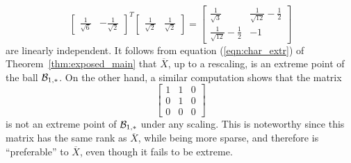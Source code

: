 \documentclass[smallextended,numbook]{svjour3}
\begin{document}
\begin{exa}
{\[\left[ \begin{array}{cc}
\frac{1}{\sqrt{6}} & -\frac{1}{\sqrt{2}}
\end{array} \right]^T
\left[ \begin{array}{cc}
\frac{1}{\sqrt{2}} & \frac{1}{\sqrt{2}}
\end{array} \right]= \left[ \begin{array}{cc}
\frac{1}{\sqrt{3}} & \frac{1}{\sqrt{12}} -\frac{1}{2} \\
\frac{1}{\sqrt{12}}-\frac{1}{2} & -1
\end{array} \right]
\] 
are linearly independent. It follows from equation (\ref{eqn:char_extr}) of Theorem~\ref{thm:exposed_main} that $\overline{X}$, up to a rescaling, is an extreme point of the ball ${{\cal B}}_{1,*}$.
On the other hand, a similar computation shows that the matrix 
\[\left[ \begin{array}{ccc}
1 & 1 &0 \\
0 & 1 & 0 \\
0 & 0 & 0
\end{array} \right]\]
is not an extreme point of ${{\cal B}}_{1,*}$ under any scaling. This is noteworthy since this matrix has the same rank as $\overline{X}$, while being more sparse, and therefore is ``preferable'' to $\overline{X}$, even though it fails to be extreme.
}
\end{exa}
\end{document}
